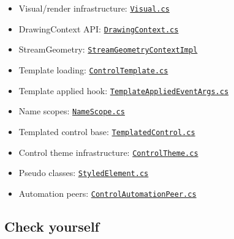 \begin{itemize}
\tightlist
\item
  Visual/render infrastructure:
  \href{https://github.com/AvaloniaUI/Avalonia/blob/master/src/Avalonia.Base/Visual.cs}{\passthrough{\lstinline!Visual.cs!}}
\item
  DrawingContext API:
  \href{https://github.com/AvaloniaUI/Avalonia/blob/master/src/Avalonia.Base/Media/DrawingContext.cs}{\passthrough{\lstinline!DrawingContext.cs!}}
\item
  StreamGeometry:
  \href{https://github.com/AvaloniaUI/Avalonia/blob/master/src/Avalonia.Base/Media/Geometry/StreamGeometryContextImpl.cs}{\passthrough{\lstinline!StreamGeometryContextImpl!}}
\item
  Template loading:
  \href{https://github.com/AvaloniaUI/Avalonia/blob/master/src/Markup/Avalonia.Markup.Xaml/Templates/ControlTemplate.cs}{\passthrough{\lstinline!ControlTemplate.cs!}}
\item
  Template applied hook:
  \href{https://github.com/AvaloniaUI/Avalonia/blob/master/src/Avalonia.Controls/Primitives/TemplateAppliedEventArgs.cs}{\passthrough{\lstinline!TemplateAppliedEventArgs.cs!}}
\item
  Name scopes:
  \href{https://github.com/AvaloniaUI/Avalonia/blob/master/src/Avalonia.Base/Styling/NameScope.cs}{\passthrough{\lstinline!NameScope.cs!}}
\item
  Templated control base:
  \href{https://github.com/AvaloniaUI/Avalonia/blob/master/src/Avalonia.Controls/Primitives/TemplatedControl.cs}{\passthrough{\lstinline!TemplatedControl.cs!}}
\item
  Control theme infrastructure:
  \href{https://github.com/AvaloniaUI/Avalonia/blob/master/src/Avalonia.Base/Styling/ControlTheme.cs}{\passthrough{\lstinline!ControlTheme.cs!}}
\item
  Pseudo classes:
  \href{https://github.com/AvaloniaUI/Avalonia/blob/master/src/Avalonia.Base/Styling/StyledElement.cs}{\passthrough{\lstinline!StyledElement.cs!}}
\item
  Automation peers:
  \href{https://github.com/AvaloniaUI/Avalonia/blob/master/src/Avalonia.Controls/Automation/Peers/ControlAutomationPeer.cs}{\passthrough{\lstinline!ControlAutomationPeer.cs!}}
\end{itemize}

\subsection{Check yourself}\label{check-yourself-21}

